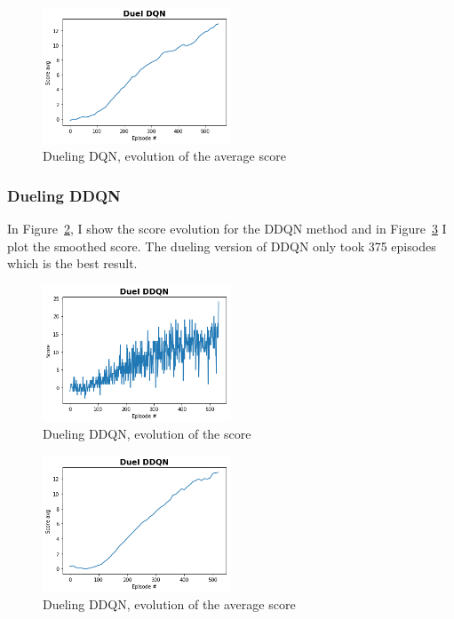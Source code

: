 \documentclass[12pt]{article}
\begin{document}
\begin{figure}[H]
 \centering
  \includegraphics[width=0.5\textwidth]{../PNG/duel_dqn_smooth.png}
  \caption{Dueling DQN, evolution of the average score}
  \label{fig:Duel_DQN_av}
\end{figure}


\subsubsection{Dueling DDQN}
In Figure~\ref{fig:duel_ddqn}, I show the score evolution for the DDQN method and in Figure~\ref{fig:duel_ddqn_av} I plot the smoothed score. The dueling version of DDQN only took 375 episodes which is the best result.

\begin{figure}[H]
 \centering
  \includegraphics[width=0.5\textwidth]{../PNG/duel_ddqn.png}
  \caption{Dueling DDQN, evolution of the score}
  \label{fig:duel_ddqn}
\end{figure}

\begin{figure}[H]
 \centering
  \includegraphics[width=0.5\textwidth]{../PNG/duel_ddqn_smooth.png}
  \caption{Dueling DDQN, evolution of the average score}
  \label{fig:duel_ddqn_av}
\end{figure}
\end{document}
